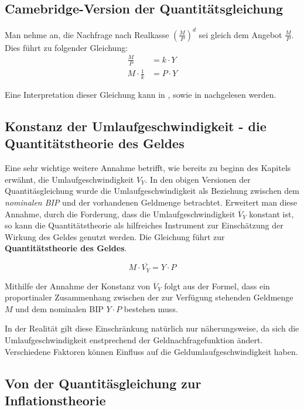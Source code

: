 \subsection{Camebridge-Version der Quantitätsgleichung}

Man nehme an, die Nachfrage nach Realkasse $(\frac{M}{P})^d$ sei gleich dem Angebot $\frac{M}{P}$. Dies führt zu folgender Gleichung\autocite[14]{historyQunatitaetstheorie}:
\begin{align}
    \frac{M}{P} &= k \cdot Y \\
    M \cdot \frac{1}{k} &= P \cdot Y
\end{align}

Eine Interpretation dieser Gleichung kann in \cite[126]{mankiw2017}, sowie in \cite[14]{historyQunatitaetstheorie} nachgelesen werden.

\subsection{Konstanz der Umlaufgeschwindigkeit - die Quantitätstheorie des Geldes}\label{sec:Umlaufgeschwindigkeit}
Eine sehr wichtige weitere Annahme betrifft, wie bereits zu beginn des Kapitels erwähnt, die Umlaufgeschwindigkeit $V_Y$. In den obigen Versionen der Quantitäsgleichung wurde die Umlaufgeschwindigkeit als Beziehung zwischen dem \textit{nominalen BIP} und der vorhandenen Geldmenge betrachtet. Erweitert man diese Annahme, durch die Forderung, dass die Umlaufgeschwindigkeit $\overline{V}_Y$ konstant ist, so kann die Quantitätstheorie als hilfreiches Instrument zur Einschätzung der Wirkung des Geldes genutzt werden. Die Gleichung führt zur \textbf{Quantitätstheorie des Geldes}\autocite[126]{mankiw2017}.

\begin{equation}
    \tag{Quantitätshteorie des Geldes}
    M \cdot \overline{V_Y} = Y \cdot P
\end{equation}
\label{qTheorieDesGeldes}

Mithilfe der Annahme der Konstanz von $\overline{V}_Y$ folgt aus der Formel, dass ein proportinaler Zusammenhang zwischen der zur Verfügung stehenden Geldmenge $M$ und dem nominalen BIP $Y \cdot P$ bestehen muss.

In der Realität gilt diese Einschränkung natürlich nur näherungsweise, da sich die Umlaufgeschwindigkeit enstprechend der Geldnachfragefunktion ändert. Verschiedene Faktoren können Einfluss auf die Geldumlaufgeschwindigkeit haben\autocite[126]{mankiw2017}.

\subsection{Von der Quantitäsgleichung zur Inflationstheorie}

